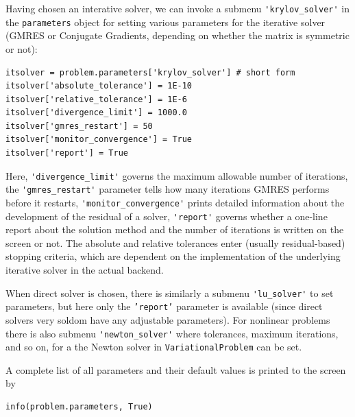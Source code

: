 Having chosen an interative solver, we can invoke
a submenu {\fontsize{12pt}{12pt}\verb!'krylov_solver'!}
in the
{\fontsize{12pt}{12pt}\texttt{parameters}} object for setting various parameters for
the iterative solver (GMRES or Conjugate Gradients, depending on
whether the matrix is symmetric or not):
\begin{Verbatim}[fontsize=\fontsize{10pt}{10pt},tabsize=8,baselinestretch=1.05,
fontfamily=tt,xleftmargin=7mm]
itsolver = problem.parameters['krylov_solver'] # short form
itsolver['absolute_tolerance'] = 1E-10
itsolver['relative_tolerance'] = 1E-6
itsolver['divergence_limit'] = 1000.0
itsolver['gmres_restart'] = 50
itsolver['monitor_convergence'] = True
itsolver['report'] = True
\end{Verbatim}
\noindent
Here, {\fontsize{12pt}{12pt}\verb!'divergence_limit'!}
governs the maximum allowable number of iterations,
the {\fontsize{12pt}{12pt}\verb!'gmres_restart'!} parameter tells how many iterations GMRES performs before
it restarts,
{\fontsize{12pt}{12pt}\verb!'monitor_convergence'!} prints detailed information about the
development of the residual of a solver,
{\fontsize{12pt}{12pt}\verb!'report'!} governs whether a one-line report about the solution
method and the number of iterations
is written on the screen or not. The absolute and relative tolerances
enter (usually residual-based) stopping criteria, which are dependent on
the implementation of the underlying iterative solver in the actual backend.


When direct solver is chosen, there is similarly a submenu
{\fontsize{12pt}{12pt}\verb!'lu_solver'!} to set parameters, but here only the {\fontsize{12pt}{12pt}\texttt{'report'}}
parameter is available (since direct solvers very soldom have any
adjustable parameters). For nonlinear problems there is also
submenu {\fontsize{12pt}{12pt}\verb!'newton_solver'!} where tolerances, maximum iterations, and
so on, for a the Newton solver in {\fontsize{12pt}{12pt}\texttt{VariationalProblem}} can be set.

A complete list of all parameters and their default values
is printed to the screen by
\begin{Verbatim}[fontsize=\fontsize{10pt}{10pt},tabsize=8,baselinestretch=1.05,
fontfamily=tt,xleftmargin=7mm]
info(problem.parameters, True)
\end{Verbatim}
\noindent

